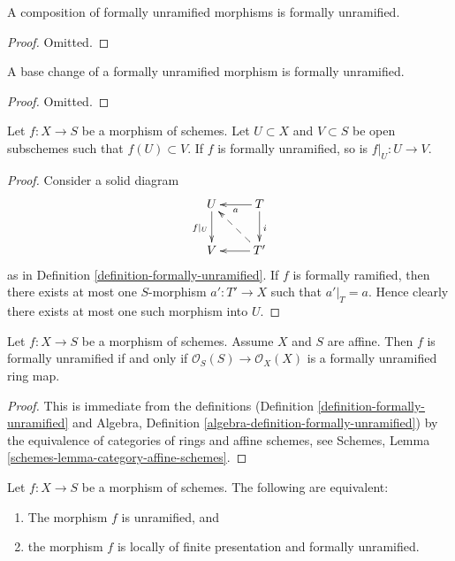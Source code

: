 \begin{lemma}
\label{lemma-composition-formally-unramified}
A composition of formally unramified morphisms is formally unramified.
\end{lemma}

\begin{proof}
Omitted.
\end{proof}

\begin{lemma}
\label{lemma-base-change-formally-unramified}
A base change of a formally unramified morphism is formally unramified.
\end{lemma}

\begin{proof}
Omitted.
\end{proof}

\begin{lemma}
\label{lemma-formally-unramified-on-opens}
Let $f : X \to S$ be a morphism of schemes.
Let $U \subset X$ and $V \subset S$ be open subschemes such that
$f(U) \subset V$. If $f$ is formally unramified, so is $f|_U : U \to V$.
\end{lemma}

\begin{proof}
Consider a solid diagram
$$
\xymatrix{
U \ar[d]_{f|_U} & T \ar[d]^i \ar[l]^a \\
V & T' \ar[l] \ar@{-->}[lu]
}
$$
as in Definition \ref{definition-formally-unramified}. If $f$ is formally
ramified, then there exists at most one
$S$-morphism $a' : T' \to X$ such that $a'|_T = a$.
Hence clearly there exists at most one such morphism into $U$.
\end{proof}

\begin{lemma}
\label{lemma-affine-formally-unramified}
Let $f : X \to S$ be a morphism of schemes.
Assume $X$ and $S$ are affine.
Then $f$ is formally unramified if and only if
$\mathcal{O}_S(S) \to \mathcal{O}_X(X)$ is a formally unramified
ring map.
\end{lemma}

\begin{proof}
This is immediate from the definitions
(Definition \ref{definition-formally-unramified} and
Algebra, Definition \ref{algebra-definition-formally-unramified})
by the equivalence of categories of rings and affine schemes,
see
Schemes, Lemma \ref{schemes-lemma-category-affine-schemes}.
\end{proof}

\begin{lemma}
\label{lemma-unramified-formally-unramified}
Let $f : X \to S$ be a morphism of schemes.
The following are equivalent:
\begin{enumerate}
\item The morphism $f$ is unramified, and
\item the morphism $f$ is locally of finite presentation and
formally unramified.
\end{enumerate}
\end{lemma}

